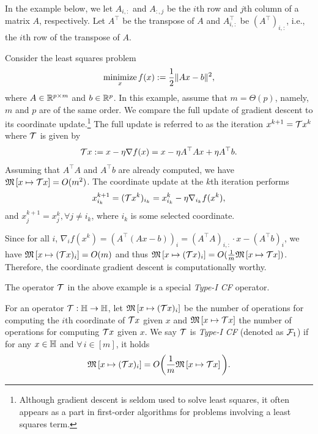In the example below,  we let $A_{i,:}$ and $A_{:,j}$ be the $i$th row and $j$th column of a matrix $A$, respectively. Let $A^\top$ be the transpose of $A$ and $A^\top_{i,:}$ be $(A^\top)_{i,:}$, i.e., the $i$th row of the transpose of $A$.

\begin{example}\label{ex:lsq1}
Consider the least squares problem
\begin{equation}
\Min_{x} f(x):=\frac{1}{2} \|A x - b\|^2,\label{lsq}
\end{equation}
where $A \in \mathbb{R}^{p \times m}$ and $b \in \mathbb{R}^p$. In this example, assume that $m=\Theta(p)$, namely, $m$ and $p$ are of the same order.  We compare the full update of gradient descent to its coordinate update.\footnote{Although gradient descent is seldom used to solve least squares, it often appears as a part in first-order algorithms for problems involving a least squares term.}
The full update is referred to as the iteration
$x^{k+1}= {\mathcal{T}} x^k $ where ${\mathcal{T}}$ is given by
\begin{equation}\label{eq:LSfull}
\cT x:=x-\eta\nabla f(x)=x-\eta A^\top Ax + \eta A^\top b.
\end{equation}
Assuming that $ A^\top A$ and $ A^\top b$ are already computed, we have $\mathfrak{M}\left[{x}\mapsto {{\mathcal{T}}x}\right]=O(m^2)$. The coordinate update at the $k$th iteration performs
$$x_{i_k}^{k+1}=({\mathcal{T}} x^k)_{i_k} =x^k_{i_k}-\eta\nabla_{i_k} f(x^k),$$
and $x_j^{k+1}=x_j^{k},\forall j\neq i_k$, where $i_k$ is some selected coordinate.

Since for all $i$, $\nabla_i f(x^k)=\left(A^\top (Ax-b)\right)_{i}=(A^\top A)_{i,:}\cdot x-(A^\top b)_{i}$,
we have $\mathfrak{M}\left[{x}\mapsto {({\mathcal{T}}x)_i }\right]=O(m)$ and thus $\mathfrak{M}\left[{x}\mapsto {({\mathcal{T}}x)_i }\right]=O(\frac{1}{m}\mathfrak{M}\left[{x}\mapsto {{\mathcal{T}}x}\right])$. Therefore, the coordinate gradient descent is computationally worthy.
\end{example}
The operator ${\mathcal{T}}$ in the above example is a special \emph{Type-I CF} operator.
\begin{definition}[Type-I CF]
For an operator ${\mathcal{T}}: \mathbb{H}\to\mathbb{H}$, let $\mathfrak{M}\left[{x}\mapsto {({\mathcal{T}}x)_i}\right]$ be the number of operations for computing the $i$th coordinate of ${\mathcal{T}} x$ given $x$ and $\mathfrak{M}\left[{x}\mapsto {{\mathcal{T}}x}\right]$ the number of operations for computing ${\mathcal{T}} x$ given $x$.
We say ${\mathcal{T}}$ is \emph{Type-I CF} (denoted as ${\mathcal{F}}_1$) if for any $x\in\mathbb{H}$ and $\forall\, i\in [m]$, it holds
$$\mathfrak{M}\left[{x}\mapsto {({\mathcal{T}}x)_i}\right]= O\bigg(\frac{1}{m}\mathfrak{M}\left[{x}\mapsto {{\mathcal{T}}x}\right]\bigg).$$
\end{definition}
